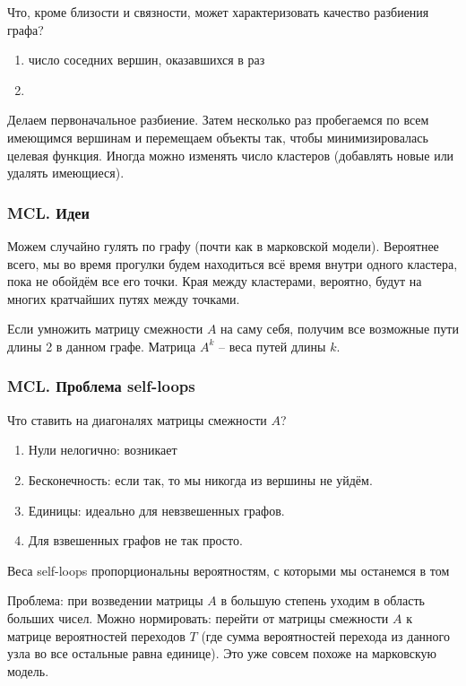 \documentclass[main.tex]{subfiles}
\begin{document}
Что, кроме близости и связности, может характеризовать качество разбиения графа?

\begin{enumerate}[noitemsep]
	\item число соседних вершин, оказавшихся в раз
	\item %
\end{enumerate}

Делаем первоначальное разбиение.
Затем несколько раз пробегаемся по всем имеющимся вершинам и перемещаем объекты так, чтобы минимизировалась целевая функция.
Иногда можно изменять число кластеров (добавлять новые или удалять имеющиеся).

\subsubsection{MCL. Идеи}

Можем случайно гулять по графу (почти как в марковской модели).
Вероятнее всего, мы во время прогулки будем находиться всё время внутри одного кластера, пока не обойдём все его точки.
Края между кластерами, вероятно, будут на многих кратчайших путях между точками.

Если умножить матрицу смежности $A$ на саму себя, получим все возможные пути длины 2 в данном графе.
Матрица $A^k$ -- веса путей длины $k$.

\subsubsection{MCL. Проблема self-loops}

Что ставить на диагоналях матрицы смежности $A$?

\begin{enumerate}[noitemsep]
	\item Нули нелогично: возникает 
	
	\item Бесконечность: если так, то мы никогда из вершины не уйдём.
	
	\item Единицы: идеально для невзвешенных графов.
	\item Для взвешенных графов не так просто.
\end{enumerate}


Веса self-loops пропорциональны вероятностям, с которыми мы останемся в том 

Проблема: при возведении матрицы $A$ в большую степень уходим в область больших чисел.
Можно нормировать: перейти от матрицы смежности $A$ к матрице вероятностей переходов $T$ (где сумма вероятностей перехода из данного узла во все остальные равна единице).
Это уже совсем похоже на марковскую модель.
\end{document}
